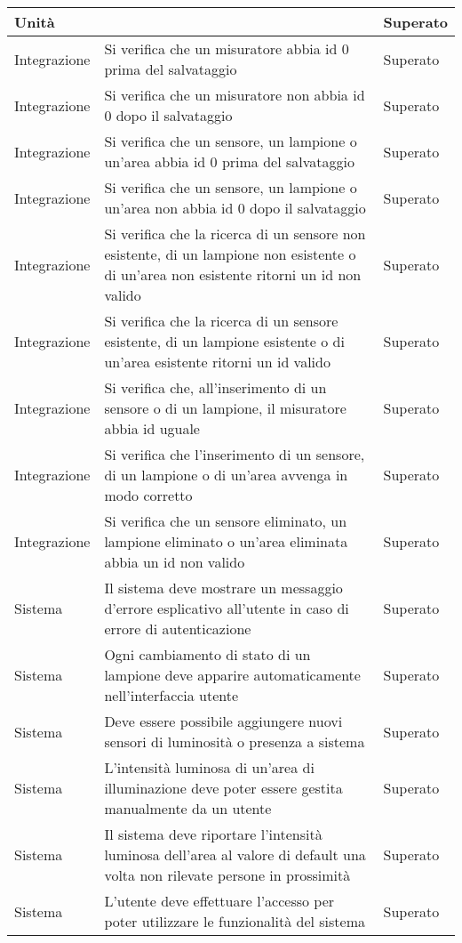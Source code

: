 \begin{center}
\begin{xltabular}{\linewidth}{|l|X|l|}
        Unità &  & Superato\\
        \hline
        Integrazione & Si verifica che un misuratore abbia id 0 prima del salvataggio & Superato\\
        Integrazione & Si verifica che un misuratore non abbia id 0 dopo il salvataggio & Superato\\
        Integrazione & Si verifica che un sensore, un lampione o un'area abbia id 0 prima del salvataggio & Superato\\
        Integrazione & Si verifica che un sensore, un lampione o un'area non abbia id 0 dopo il salvataggio & Superato\\
        Integrazione & Si verifica che la ricerca di un sensore non esistente, di un lampione non esistente o di un'area non esistente ritorni un id non valido & Superato\\
        Integrazione & Si verifica che la ricerca di un sensore esistente, di un lampione esistente o di un'area esistente ritorni un id valido & Superato\\
        Integrazione & Si verifica che, all'inserimento di un sensore o di un lampione, il misuratore abbia id uguale & Superato\\
        Integrazione & Si verifica che l'inserimento di un sensore, di un lampione o di un'area avvenga in modo corretto & Superato\\
        Integrazione & Si verifica che un sensore eliminato, un lampione eliminato o un'area eliminata abbia un id non valido & Superato\\
        \hline
        Sistema & Il sistema deve mostrare un messaggio d'errore esplicativo all'utente in caso di errore di autenticazione & Superato\\
        Sistema & Ogni cambiamento di stato di un lampione deve apparire automaticamente nell'interfaccia utente & Superato\\
        Sistema & Deve essere possibile aggiungere nuovi sensori di luminosità o presenza a sistema & Superato\\
        Sistema & L'intensità luminosa di un'area di illuminazione deve poter essere gestita manualmente da un utente & Superato\\
        Sistema & Il sistema deve riportare l'intensità luminosa dell'area al valore di default una volta non rilevate persone in prossimità & Superato\\
        Sistema & L'utente deve effettuare l'accesso per poter utilizzare le funzionalità del sistema & Superato\\

\end{xltabular}
\end{center}
